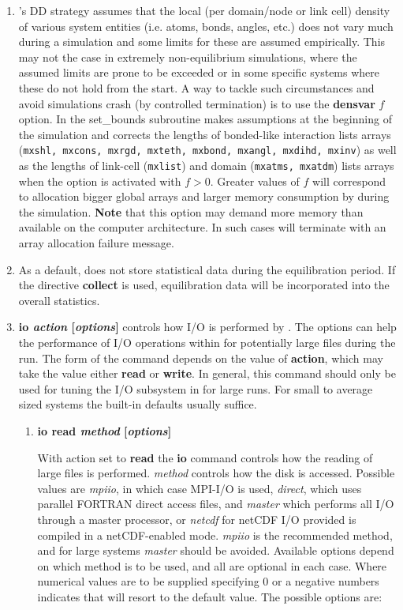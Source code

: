 \begin{enumerate}
\item \D's DD strategy assumes that the local (per domain/node or
link cell) density of various system entities (i.e. atoms, bonds,
angles, etc.) does not vary much during a simulation and some
limits for these are assumed empirically.  This may not the case in
extremely non-equilibrium simulations, where the assumed limits
are prone to be exceeded or in some specific systems where these
do not hold from the start.  A way to tackle such circumstances and
avoid simulations crash (by controlled termination) is to use the
{\bf densvar} $f$ option.  In the {\sc set\_bounds} subroutine \D
makes assumptions at the beginning of the simulation and corrects
the lengths of bonded-like interaction lists arrays ({\tt mxshl,
mxcons, mxrgd, mxteth, mxbond, mxangl, mxdihd, mxinv}) as well as the
lengths of link-cell ({\tt mxlist}) and domain ({\tt mxatms, mxatdm})
lists arrays when the option is activated with $f > 0$.  Greater
values of $f$ will correspond to allocation bigger global arrays
and larger memory consumption by \D during the simulation.
{\bf Note} that this option may demand more memory than available
on the computer architecture.  In such cases \D will terminate
with an array allocation failure message.

\item As a default, \D does not store statistical data during the
equilibration period.  If the directive {\bf collect} is used,
equilibration data will be incorporated into the overall statistics.

\item {\bf io {\em action} [{\em options}]} controls how I/O is performed
by \D.  The options can help the performance of I/O
operations within \D for potentially large files during the run.
The form of the command depends on the value of {\bf action},
which may take the value either {\bf read} or {\bf write}.
In general, this command should only be used for tuning the
I/O subsystem in \D for large runs.  For small to average
sized systems the built-in defaults usually suffice.

\begin{enumerate}
\item {\bf io read {\em method} [{\em options}]}

With action set to {\bf read} the {\bf io} command controls how
the reading of large files is performed.  {\em method} controls
how the disk is accessed.  Possible values are {\em mpiio},
in which case MPI-I/O is used, {\em direct}, which uses
parallel FORTRAN direct access files, and {\em master} which
performs all I/O through a master processor, or {\em netcdf}
for netCDF I/O provided \D is compiled in a netCDF-enabled mode.
{\em mpiio} is the recommended method, and for large systems
{\em master} should be avoided.  Available options depend
on which method is to be used, and all are optional in each
case.  Where numerical values are to be supplied specifying
0 or a negative numbers indicates that \D will resort to
the default value.  The possible options are:


\end{enumerate}
\end{enumerate}

